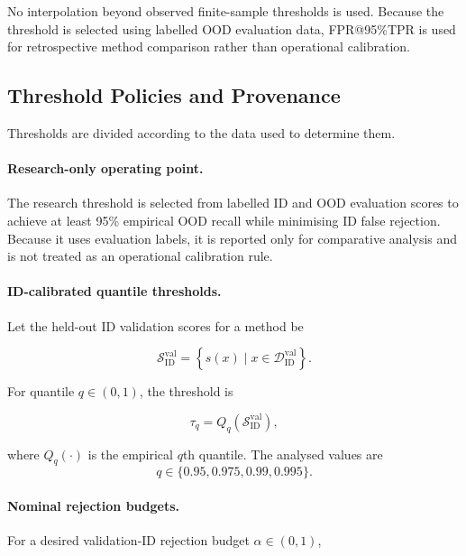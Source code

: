 \documentclass[fleqn,12pt]{olplainarticle}
\begin{document}
No interpolation beyond observed finite-sample thresholds is used. Because the
threshold is selected using labelled OOD evaluation data, FPR@95\%TPR is used
for retrospective method comparison rather than operational calibration.

\subsection{Threshold Policies and Provenance}
\label{subsec:threshold_policies}

Thresholds are divided according to the data used to determine them.

\paragraph{Research-only operating point.}
The research threshold is selected from labelled ID and OOD evaluation scores
to achieve at least 95\% empirical OOD recall while minimising ID false
rejection. Because it uses evaluation labels, it is reported only for
comparative analysis and is not treated as an operational calibration rule.

\paragraph{ID-calibrated quantile thresholds.}
Let the held-out ID validation scores for a method be

\begin{equation}
    \mathcal{S}_{\mathrm{ID}}^{\mathrm{val}}
    =
    \left\{
        s(x)
        \mid
        x\in\mathcal{D}_{\mathrm{ID}}^{\mathrm{val}}
    \right\}.
    \label{eq:protocol_validation_scores}
\end{equation}

For quantile $q\in(0,1)$, the threshold is

\begin{equation}
    \tau_q
    =
    Q_q
    \left(
        \mathcal{S}_{\mathrm{ID}}^{\mathrm{val}}
    \right),
    \label{eq:protocol_id_quantile}
\end{equation}

where $Q_q(\cdot)$ is the empirical $q$th quantile. The analysed values are
\[
    q\in\{0.95,0.975,0.99,0.995\}.
\]

\paragraph{Nominal rejection budgets.}
For a desired validation-ID rejection budget $\alpha\in(0,1)$,
\end{document}
